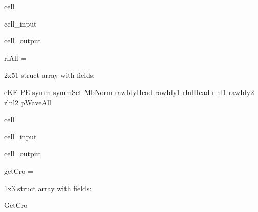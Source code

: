 \documentclass[letterpaper,10pt,english]{jupyterBook}
\begin{document}
\begin{sphinxuseclass}{cell}\begin{sphinxVerbatimInput}

\begin{sphinxuseclass}{cell_input}
\begin{sphinxVerbatim}[commandchars=\\\{\}]
\end{sphinxVerbatim}

\end{sphinxuseclass}\end{sphinxVerbatimInput}
\begin{sphinxVerbatimOutput}

\begin{sphinxuseclass}{cell_output}
\begin{sphinxVerbatim}[commandchars=\\\{\}]
rlAll = 

  2x51 struct array with fields:

    eKE
    PE
    symm
    symmSet
    MbNorm
    rawIdyHead
    rawIdy1
    rlnlHead
    rlnl1
    rawIdy2
    rlnl2
    pWaveAll
\end{sphinxVerbatim}

\end{sphinxuseclass}\end{sphinxVerbatimOutput}

\end{sphinxuseclass}
\begin{sphinxuseclass}{cell}\begin{sphinxVerbatimInput}

\begin{sphinxuseclass}{cell_input}
\begin{sphinxVerbatim}[commandchars=\\\{\}]
\end{sphinxVerbatim}

\end{sphinxuseclass}\end{sphinxVerbatimInput}
\begin{sphinxVerbatimOutput}

\begin{sphinxuseclass}{cell_output}
\begin{sphinxVerbatim}[commandchars=\\\{\}]
getCro = 

  1x3 struct array with fields:

    GetCro
\end{sphinxVerbatim}

\end{sphinxuseclass}\end{sphinxVerbatimOutput}

\end{sphinxuseclass}
\end{document}
